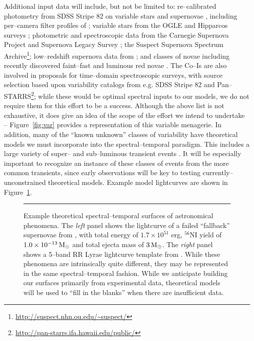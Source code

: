 Additional input data will include, but not be limited to: re--calibrated
photometry from SDSS Stripe 82 on variable stars \citep{2010ApJ...708..717S} and
supernovae \citep{2008AJ....136.2306H,2011ApJ...738..162S}, including
per--camera filter profiles of \cite{2007AJ....134..973I}; variable stars from
the OGLE and Hipparcos surveys \citep{2007A&A...475.1159D}; photometric and
spectroscopic data from the Carnegie Supernova Project
\citep[e.g.][]{2010AJ....139..519C} and Supernova Legacy Survey
\citep[e.g.][]{2011yCat..74101262W}; the Suspect Supernova Spectrum
Archive\footnote{\url{http://suspect.nhn.ou.edu/~suspect/}}; low--redshift
supernova data from \cite{2006AJ....131..527J}; and classes of novae including
recently discovered faint--fast \citep{2011ApJ...735...94K} and luminous red
novae \citep{2011ApJ...730..134K}.  The Co--Is are also involved in proposals
for time--domain spectroscopic surveys, with source selection based upon
variability catalogs from e.g. SDSS Stripe 82 and
Pan--STARRS\footnote{\url{http://pan-starrs.ifa.hawaii.edu/public/}}; while
these would be optimal spectral inputs to our models, we do not require them for
this effort to be a success.  Although the above list is not exhaustive, it does
give an idea of the scope of the effort we intend to undertake --
Figure~\ref{fig:var} provides a representation of this variable menagerie. In
addition, many of the ``known unknown'' classes of variability have theoretical
models we must incorporate into the spectral--temporal paradigm.  This includes
a large variety of super-- and sub--luminous transient events
\citep[e.g.][]{2010ApJ...715..767S,2009ApJ...707..193F}.  It will be especially
important to recognize an instance of these classes of events from the more
common transients, since early observations will be key to testing
currently--unconstrained theoretical models.  Example model lightcurves are
shown in Figure~\ref{fig:sts}.

\begin{figure}[t]
\centerline{ \hfil
{}} \smallskip
\caption[]{\footnotesize Example theoretical spectral--temporal surfaces of
astronomical phenomena.  The {\it left} panel shows the lightcurve of a failed
``fallback'' supernovae from \cite{2009ApJ...707..193F}, with total energy of
$1.7 \times 10^{51}$ erg, $^{56}$NI yield of $1.0 \times 10^{-13} {\rm\,M_\odot}$ and
total ejecta mass of $3 {\rm\,M_\odot}$.  The {\it right} panel shows a 5--band RR Lyrae
lightcurve template from \cite{2010ApJ...708..717S}.  While these phenomena are
intrinsically quite different, they may be represented in the same
spectral--temporal fashion.  While we anticipate building our surfaces primarily
from experimental data, theoretical models will be used to ``fill in the
blanks'' when there are insufficient data.} \medskip \hrule \label{fig:sts}
\end{figure}

